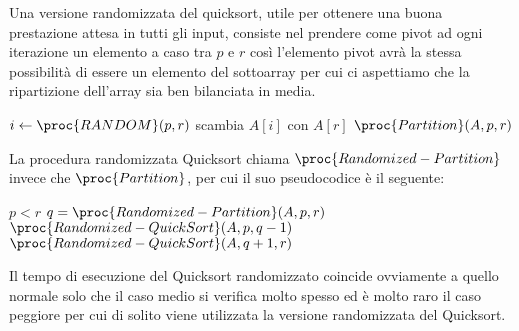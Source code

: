 Una versione randomizzata del quicksort, utile per ottenere una buona prestazione attesa
in tutti gli input, consiste nel prendere come pivot ad ogni iterazione un elemento a caso
tra $p$ e $r$ così l'elemento pivot avrà la stessa possibilità di essere un elemento
del sottoarray per cui ci aspettiamo che la ripartizione dell'array sia ben bilanciata in media.

\begin{codebox}
\li $i \gets \proc{RANDOM}(p,r)$
\li scambia $A[i]$ con $A[r]$
\li \Return $\proc{Partition}(A,p,r)$
\end{codebox}
La procedura randomizzata Quicksort chiama $\proc{Randomized-Partition}$
invece che $\proc{Partition}$, per cui il suo pseudocodice è il seguente:
\begin{codebox}
\li \If $p < r$
    \Then
\li           $q = \proc{Randomized-Partition}(A,p,r)$
\li           $\proc{Randomized-QuickSort}(A,p,q-1)$
\li           $\proc{Randomized-QuickSort}(A,q+1,r)$
    \End
\end{codebox}
Il tempo di esecuzione del Quicksort randomizzato coincide ovviamente a quello normale
solo che il caso medio si verifica molto spesso ed è molto raro il caso peggiore
per cui di solito viene utilizzata la versione randomizzata del Quicksort.
